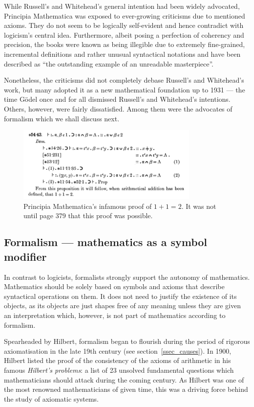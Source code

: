\documentclass[hidelinks]{article}
\begin{document}
While Russell's and Whitehead's general intention had been widely advocated, Principia Mathematica was exposed to ever-growing criticisms due to mentioned axioms. They do not seem to be logically self-evident and hence contradict with logicism's central idea. Furthermore, albeit posing a perfection of coherency and precision, the books were known as being illegible due to extremely fine-grained, incremental definitions and rather unusual syntactical notations and have been described as ``the outstanding example of an unreadable masterpiece''\cite[p.~154]{math_experience}.

Nonetheless, the criticisms did not completely debase Russell's and Whitehead's work, but many adopted it as a new mathematical foundation up to 1931 --- the time Gödel once and for all dismissed Russell's and Whitehead's intentions. Others, however, were fairly dissatisfied. Among them were the advocates of formalism which we shall discuss next.

\begin{figure}[h]
	\centering
	\includegraphics[width=0.8\textwidth]{img/principia_mathematica.png}
	\caption{Principia Mathematica's infamous proof of $1+1=2$. It was not until page 379 that this proof was possible.}
\end{figure}

\subsection{Formalism --- mathematics as a symbol modifier}\label{ssec_formalism}
In contrast to logicists, formalists strongly support the autonomy of mathematics. 
Mathematics should be solely based on symbols and axioms that describe syntactical operations on them. It does not need to justify the existence of its objects, as its objects are just shapes free of any meaning unless they are given an interpretation which, however, is not part of mathematics according to formalism.

Spearheaded by Hilbert, formalism began to flourish during the period of rigorous axiomatisation in the late 19th century (see section~\ref{ssec_causes}). 
In 1900, Hilbert listed the proof of the consistency of the axioms of arithmetic in his famous \textit{Hilbert's problems}: a list of 23 unsolved fundamental questions which mathematicians should attack during the coming century. As Hilbert was one of the most renowned mathematicians of given time, this was a driving force behind the study of axiomatic systems.
\end{document}
